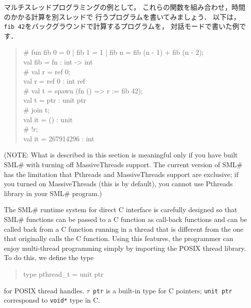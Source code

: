 \documentclass{jbook}
\newcommand{\smlsharp}{SML\#}
\newenvironment{program}{\begin{quote}\begin{tt}}%
                        {\end{tt}\end{quote}}
\begin{document}
	マルチスレッドプログラミングの例として，
これらの関数を組み合わせ，時間のかかる計算を別スレッドで
行うプログラムを書いてみましょう．
	以下は，{\tt fib 42}をバックグラウンドで計算するプログラムを，
対話モードで書いた例です．
\begin{program}
\# fun fib 0 = 0 | fib 1 = 1 | fib n = fib (n - 1) + fib (n - 2);\\
val fib = fn : int -> int\\
\# val r = ref 0;\\
val r = ref 0 : int ref\\
\# val t = spawn (fn () => r := fib 42);\\
val t = ptr : unit ptr\\
\# join t;\\
val it = () : unit\\
\# !r;\\
val it = 267914296 : int
\end{program}

\else%

	(NOTE: What is described in this section is meaningful only if
you have built \smlsharp{} with turning off MassiveThreads support.
	The current version of \smlsharp{} has the limitation that
Pthreads and MassiveThreads support are exclusive;
if you turned on MassiveThreads (this is by default),
you cannot use Pthreads library in your \smlsharp{} program.)

	The \smlsharp{} runtime system for direct C interface is
carefully designed so that \smlsharp{} functions can be passed to a C
function as call-back functions and can be called back from a C function
running in a thread that is different from the one that originally calls
the C function. 
	Using this features, the programmer can enjoy multi-thread
programming simply by importing the POSIX thread library.
	To do this, we define the type
\begin{program}
type pthread\_t = unit ptr
\end{program}
for POSIX thread handles.
	{\tt $\tau$ ptr} is a built-in type for C pointers;
{\tt unit ptr} corresponsd to {\tt void*} type in C. 
\end{document}
